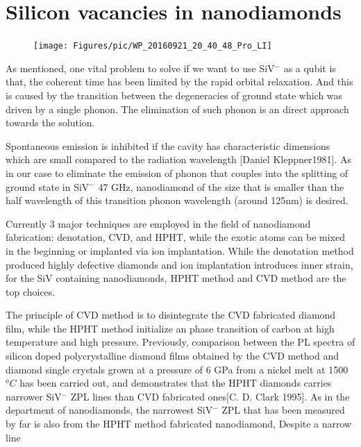 
\section[Silicon vacancies in nanodiamonds]{Silicon vacancies in nanodiamonds}
\FloatBarrier
\begin{figure}[h]
\centering
\texttt{[image: Figures/pic/WP\_20160921\_20\_40\_48\_Pro\_LI]}
\caption{}
\label{fig:wp20160921204048proli}
\end{figure}
\FloatBarrier
As mentioned, one vital problem to solve if we want to use SiV$^{-}$ as a qubit is that, the coherent time has been limited by the rapid orbital relaxation. And this is caused by the transition between the degeneracies of ground state which was driven by a single phonon. The elimination of such phonon is an direct approach towards the solution.

Spontaneous emission is inhibited if the cavity has characteristic dimensions which are small compared to the radiation wavelength [Daniel Kleppner1981]. As in our case to eliminate the emission of phonon that couples into the splitting of ground state in SiV$^{-}$ 47 GHz, nanodiamond of the size that is smaller than the half wavelength of this transition phonon wavelength (around 125nm) is desired. 

Currently 3 major techniques are employed in the field of nanodiamond fabrication: denotation, CVD, and HPHT, while the exotic atoms can be mixed in the beginning or implanted via ion implantation. While the denotation method produced highly defective diamonds and ion implantation introduces inner strain, for the SiV containing nanodiamonds, HPHT method and CVD method are the top choices.

The principle of CVD method is to disintegrate the CVD fabricated diamond film, while the HPHT method initialize an phase transition of carbon at high temperature and high pressure. Previously, comparison between the PL spectra of silicon doped polycrystalline diamond films obtained by the CVD method and diamond single crystals grown at a pressure of 6 GPa from a nickel melt at 1500$^{o}C$ has been carried out, and demonstrates that the HPHT diamonds carries narrower SiV$^{-}$ ZPL lines than CVD fabricated ones[C. D. Clark 1995]. As in the department of nanodiamonds, the narrowest SiV$^{-}$ ZPL that has been measured by far is also from the HPHT method fabricated nanodiamond, 
Despite a narrow line 


